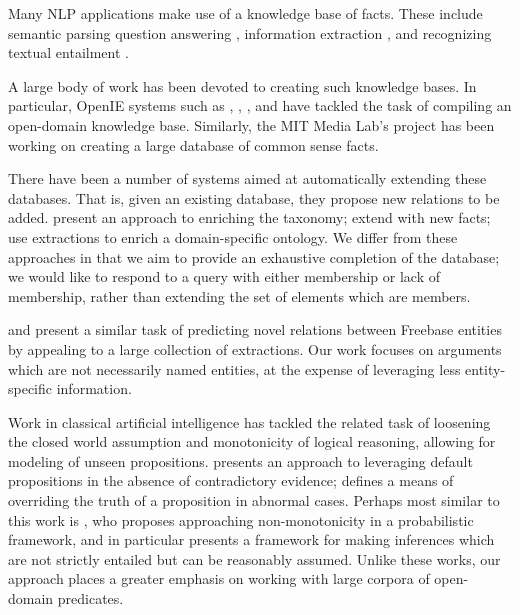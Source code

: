 Many NLP applications make use of a knowledge base of facts.
These include semantic parsing
	\cite{key:1996zelle-semantics,key:2005zettlemoyer-semantics,key:2005kate-semantics,key:2007zettlemoyer-semantics}
  question answering \cite{key:2001voorhees-trec},
  information extraction
  \cite{key:2011hoffman-kbp,key:2012surdeanu-mimlre}, and recognizing textual
  entailment
  \cite{key:2010-schoenmackers-horn,key:2011berant-entailment}.

A large body of work has been devoted to creating
  such knowledge bases.
In particular, OpenIE systems such as
   \cite{key:2007yates-textrunner},
   \cite{key:2011fader-reverb},
   \cite{key:2012mausam-ollie},
  and  \cite{key:2010carlson-nell} have tackled the task of compiling
  an open-domain knowledge base.
Similarly, the MIT Media Lab's  project
  \cite{key:2004liu-conceptnet}
  has been working on creating a large database of common sense
  facts.

There have been a number of systems aimed at automatically
  extending these databases.
That is, given an existing database, they propose new relations to be added.
 present an approach to enriching the 
  taxonomy;
   extend  with new facts;
   use  extractions to enrich
  a domain-specific ontology.
We differ from these approaches in that we aim to provide an exhaustive
  completion of the database; we would like to respond
  to a query with either membership or lack of membership, rather than
  extending the set of elements which are members.

 and  present
  a similar task of predicting novel relations between Freebase entities by
  appealing to a large collection of  extractions.
Our work focuses on arguments which are not necessarily named entities,
  at the expense of leveraging less entity-specific information.

Work in classical artificial intelligence has tackled the related task
  of loosening the closed world assumption and monotonicity of logical
  reasoning, allowing for modeling of unseen propositions.
 presents an approach to leveraging default
  propositions in the absence of contradictory evidence;
   defines a means of overriding
  the truth of a proposition in abnormal cases.
Perhaps most similar to this work is , who
  proposes approaching non-monotonicity in a probabilistic framework,
  and in particular presents a framework for making inferences which are not
  strictly entailed but can be reasonably assumed.
Unlike these works, our approach places a greater emphasis on working with
  large corpora of open-domain predicates.
